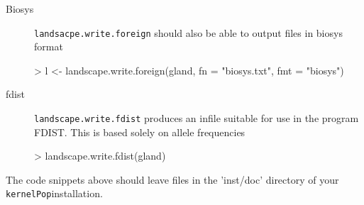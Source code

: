 \documentclass[10pt]{article}
\newcommand{\KP}{\texttt{kernelPop}}
\newcommand{\code}[1]{\texttt{#1}}
\begin{document}
\begin{description}
\begin{Schunk}
\end{Schunk}
\item [Biosys] \code{landsacpe.write.foreign} should also be able to
  output files in biosys format
\begin{Schunk}
\begin{Sinput}
> l <- landscape.write.foreign(gland, fn = "biosys.txt", fmt = "biosys")
\end{Sinput}
\end{Schunk}
\item[fdist] \code{landscape.write.fdist} produces an infile suitable
  for use in the program FDIST.  This is based solely on allele
  frequencies
\begin{Schunk}
\begin{Sinput}
> landscape.write.fdist(gland)
\end{Sinput}
\end{Schunk}
\end{description}

The code snippets above should leave files in the 'inst/doc' directory of your \KP installation.
\end{document}
